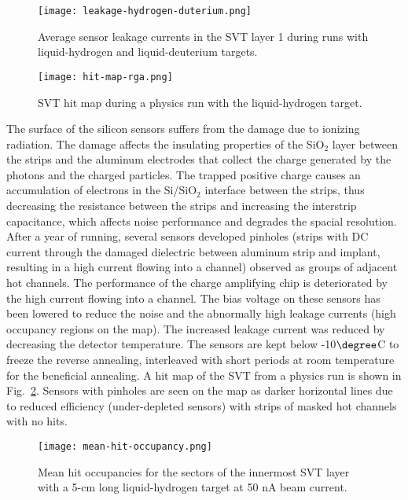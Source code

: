 \begin{figure}[hbt] 
\centering 
\texttt{[image: leakage-hydrogen-duterium.png]}
\caption{Average sensor leakage currents in the SVT layer 1 during runs with liquid-hydrogen and liquid-deuterium targets.}
\label{fig:leakage-hydrogen-duterium}
\end{figure}

\begin{figure}[hbt] 
\centering 
\texttt{[image: hit-map-rga.png]}
\caption{SVT hit map during a physics run with the liquid-hydrogen target.}
\label{fig:hit-map-rga}
\end{figure}

The surface of the silicon sensors suffers from the damage due to ionizing radiation. The damage affects the insulating properties of the SiO$_2$ layer between the strips and the aluminum electrodes that collect the charge generated by the photons and the charged particles. The trapped positive charge causes an accumulation of electrons in the Si/SiO$_2$ interface between the strips, thus decreasing the resistance between the strips and increasing the interstrip capacitance, which affects noise performance and degrades the spacial resolution. After a year of running, several sensors developed pinholes (strips with DC current through the damaged dielectric between aluminum strip and implant, resulting in a high current flowing into a channel) observed as groups of adjacent hot channels. The performance of the charge amplifying chip is deteriorated by the high current flowing into a channel. The bias voltage on these sensors has been lowered to reduce the noise and the abnormally high leakage currents (high occupancy regions on the map). The increased leakage current was reduced by decreasing the detector temperature. The sensors are kept below -10$\degree$C to freeze the reverse annealing, interleaved with short periods at room temperature for the beneficial annealing. A hit map of the SVT from a physics run is shown in Fig.~\ref{fig:hit-map-rga}. Sensors with pinholes are seen on the map as darker horizontal lines due to reduced efficiency (under-depleted sensors) with strips of masked hot channels with no hits. 

\begin{figure}[hbt] 
\centering 
\texttt{[image: mean-hit-occupancy.png]}
\caption{Mean hit occupancies for the sectors of the innermost SVT layer with a 5-cm long liquid-hydrogen target at 50 nA beam current.}
\label{fig:mean-hit-occupancy}
\end{figure}

